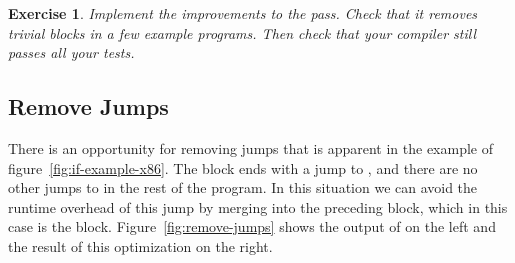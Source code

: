 \documentclass[7x10]{TimesAPriori_MIT}%
\newtheorem{exercise}[theorem]{Exercise}
\numberwithin{theorem}{chapter}
\numberwithin{definition}{chapter}
\numberwithin{equation}{chapter}
\begin{document}



\begin{exercise}\normalfont\normalsize
  Implement the improvements to the  pass.
  Check that it removes trivial blocks in a few example programs. Then
  check that your compiler still passes all your tests.
\end{exercise}


\subsection{Remove Jumps}

There is an opportunity for removing jumps that is apparent in the
example of figure~\ref{fig:if-example-x86}. The  block
ends with a jump to , and there are no other jumps to
 in the rest of the program. In this situation we can
avoid the runtime overhead of this jump by merging 
into the preceding block, which in this case is the  block.
Figure~\ref{fig:remove-jumps} shows the output of
 on the left and the result of this
optimization on the right.
\end{document}
